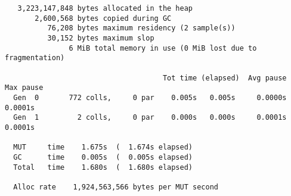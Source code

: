 \begin{verbatim}
   3,223,147,848 bytes allocated in the heap
       2,600,568 bytes copied during GC
          76,208 bytes maximum residency (2 sample(s))
          30,152 bytes maximum slop
               6 MiB total memory in use (0 MiB lost due to fragmentation)

                                     Tot time (elapsed)  Avg pause  Max pause
  Gen  0       772 colls,     0 par    0.005s   0.005s     0.0000s    0.0001s
  Gen  1         2 colls,     0 par    0.000s   0.000s     0.0001s    0.0001s

  MUT     time    1.675s  (  1.674s elapsed)
  GC      time    0.005s  (  0.005s elapsed)
  Total   time    1.680s  (  1.680s elapsed)

  Alloc rate    1,924,563,566 bytes per MUT second
\end{verbatim}
